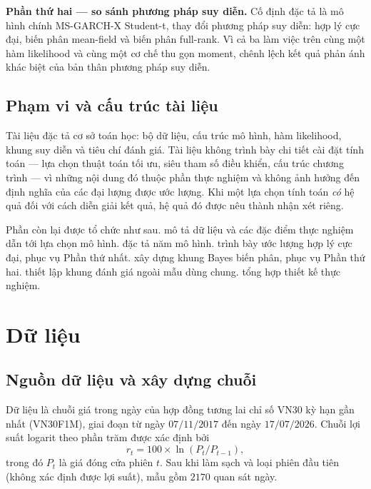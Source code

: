 \documentclass[12pt,a4paper]{article}
\numberwithin{equation}{section}
\theoremstyle{definition}
\begin{document}
\textbf{Phần thứ hai --- so sánh phương pháp suy diễn.} Cố định đặc tả là mô hình chính
MS-GARCH-X Student-t, thay đổi phương pháp suy diễn: hợp lý cực đại, biến phân mean-field
và biến phân full-rank. Vì cả ba làm việc trên cùng một hàm likelihood và cùng một cơ chế
thu gọn moment, chênh lệch kết quả phản ánh khác biệt của bản thân phương pháp suy diễn.

\subsection{Phạm vi và cấu trúc tài liệu}\label{subsec:scope}
Tài liệu đặc tả cơ sở toán học: bộ dữ liệu, cấu trúc mô hình, hàm likelihood, khung suy
diễn và tiêu chí đánh giá. Tài liệu không trình bày chi tiết cài đặt tính toán --- lựa
chọn thuật toán tối ưu, siêu tham số điều khiển, cấu trúc chương trình --- vì những nội
dung đó thuộc phần thực nghiệm và không ảnh hưởng đến định nghĩa của các đại lượng được
ước lượng. Khi một lựa chọn tính toán \emph{có} hệ quả đối với cách diễn giải kết quả, hệ
quả đó được nêu thành nhận xét riêng.

Phần còn lại được tổ chức như sau.  mô tả dữ liệu và các đặc điểm thực
nghiệm dẫn tới lựa chọn mô hình.  đặc tả năm mô hình.
 trình bày ước lượng hợp lý cực đại, phục vụ Phần thứ nhất.
 xây dựng khung Bayes biến phân, phục vụ Phần thứ hai.
 thiết lập khung đánh giá ngoài mẫu dùng chung.
 tổng hợp thiết kế thực nghiệm.

\section{Dữ liệu}\label{sec:data}

\subsection{Nguồn dữ liệu và xây dựng chuỗi}\label{subsec:data-source}
Dữ liệu là chuỗi giá trong ngày của hợp đồng tương lai chỉ số VN30 kỳ hạn gần nhất
(VN30F1M), giai đoạn từ ngày $07/11/2017$ đến ngày $17/07/2026$. Chuỗi lợi suất logarit
theo phần trăm được xác định bởi
\begin{equation}
  r_t = 100\times\ln\!\left(P_t/P_{t-1}\right),
  \label{eq:return}
\end{equation}
trong đó $P_t$ là giá đóng cửa phiên $t$. Sau khi làm sạch và loại phiên đầu tiên (không
xác định được lợi suất), mẫu gồm $2170$ quan sát ngày.
\end{document}
